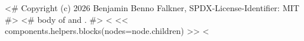 <# Copyright (c) 2026 Benjamin Benno Falkner, SPDX-License-Identifier: MIT #>
<# {body} of \exercise and \subexercise. #>
<%
{
<< components.helpers.blocks(nodes=node.children) >>
}
<%
